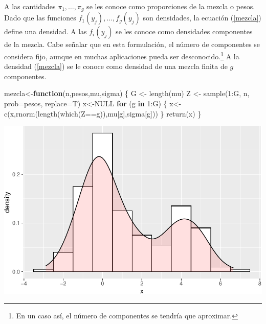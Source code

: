 \documentclass[
]{article}
\newenvironment{Shaded}{\begin{snugshade}}{\end{snugshade}}
\newcommand{\AttributeTok}[1]{\textcolor[rgb]{0.77,0.63,0.00}{#1}}
\newcommand{\ConstantTok}[1]{\textcolor[rgb]{0.00,0.00,0.00}{#1}}
\newcommand{\ControlFlowTok}[1]{\textcolor[rgb]{0.13,0.29,0.53}{\textbf{#1}}}
\newcommand{\DecValTok}[1]{\textcolor[rgb]{0.00,0.00,0.81}{#1}}
\newcommand{\FunctionTok}[1]{\textcolor[rgb]{0.00,0.00,0.00}{#1}}
\newcommand{\NormalTok}[1]{#1}
\newcommand{\OtherTok}[1]{\textcolor[rgb]{0.56,0.35,0.01}{#1}}
\newcommand{\SpecialCharTok}[1]{\textcolor[rgb]{0.00,0.00,0.00}{#1}}
\begin{document}
A las cantidades \(\pi_1,\ldots,\pi_g\) se les conoce como proporciones
de la mezcla o pesos. Dado que las funciones
\(f_1(y_j),\ldots,f_g(y_j)\) son densidades, la ecuación (\ref{mezcla})
define una densidad. A las \(f_i(y_j)\) se les conoce como densidades
componentes de la mezcla. Cabe señalar que en esta formulación, el
número de componentes se considera fijo, aunque en muchas aplicaciones
pueda ser
desconocido.\footnote{En un caso así, el número de componentes se tendría que aproximar.}
A la densidad (\ref{mezcla}) se le conoce como densidad de una mezcla
finita de \(g\) componentes.

\begin{Shaded}
\begin{Highlighting}[]
\NormalTok{mezcla}\OtherTok{\textless{}{-}}\ControlFlowTok{function}\NormalTok{(n,pesos,mu,sigma)}
\NormalTok{\{}
\NormalTok{  G }\OtherTok{\textless{}{-}} \FunctionTok{length}\NormalTok{(mu)}
\NormalTok{  Z }\OtherTok{\textless{}{-}} \FunctionTok{sample}\NormalTok{(}\DecValTok{1}\SpecialCharTok{:}\NormalTok{G, n, }\AttributeTok{prob=}\NormalTok{pesos, }\AttributeTok{replace=}\NormalTok{T)}
\NormalTok{  x}\OtherTok{\textless{}{-}}\ConstantTok{NULL}
  \ControlFlowTok{for}\NormalTok{ (g }\ControlFlowTok{in} \DecValTok{1}\SpecialCharTok{:}\NormalTok{G)}
\NormalTok{  \{}
\NormalTok{    x}\OtherTok{\textless{}{-}}\FunctionTok{c}\NormalTok{(x,}\FunctionTok{rnorm}\NormalTok{(}\FunctionTok{length}\NormalTok{(}\FunctionTok{which}\NormalTok{(Z}\SpecialCharTok{==}\NormalTok{g)),mu[g],sigma[g]))}
\NormalTok{  \}}
  \FunctionTok{return}\NormalTok{(x)}
\NormalTok{\}}
\end{Highlighting}
\end{Shaded}

\includegraphics{Reporte0108_files/figure-latex/unnamed-chunk-2-1.pdf}
\end{document}
